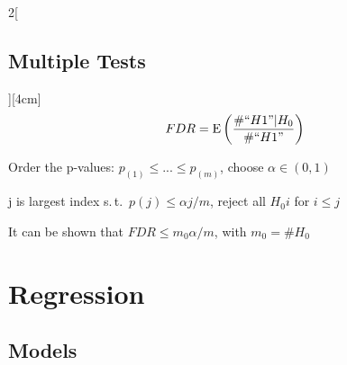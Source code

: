 \documentclass[8pt]{extarticle}
\begin{document}
\begin{multicols}{2}[\subsection{Multiple Tests}][4cm]
$$FDR = \mathrm{E}\left(\frac{\#``H1"|H_0}{\#``H1"}\right)$$

\noindent Order the p-values: $p_{(1)} \leq...\leq p_{(m)} $, choose $\alpha\in(0,1)$

\noindent j is largest index s.\,t.\ $p(j) \leq \alpha j/m$, reject all $H_0i$ for $i\leq j$

\vspace{1em}
It can be shown that $FDR \leq m_0\alpha/m$, with $m_0 = \# H_0$

\end{multicols}






\section{Regression}



\subsection{Models}
\end{document}
